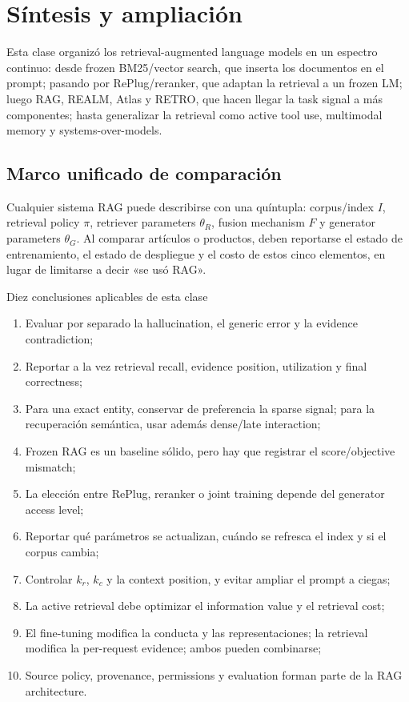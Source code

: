 \section{Síntesis y ampliación}

Esta clase organizó los retrieval-augmented language models en un espectro continuo: desde frozen BM25/vector search, que inserta los documentos en el prompt; pasando por RePlug/reranker, que adaptan la retrieval a un frozen LM; luego RAG, REALM, Atlas y RETRO, que hacen llegar la task signal a más componentes; hasta generalizar la retrieval como active tool use, multimodal memory y systems-over-models.

\subsection{Marco unificado de comparación}

Cualquier sistema RAG puede describirse con una quíntupla: corpus/index $I$, retrieval policy $\pi$, retriever parameters $\theta_R$, fusion mechanism $F$ y generator parameters $\theta_G$. Al comparar artículos o productos, deben reportarse el estado de entrenamiento, el estado de despliegue y el costo de estos cinco elementos, en lugar de limitarse a decir «se usó RAG».

\begin{importantbox}{Diez conclusiones aplicables de esta clase}
\begin{enumerate}
  \item Evaluar por separado la hallucination, el generic error y la evidence contradiction;
  \item Reportar a la vez retrieval recall, evidence position, utilization y final correctness;
  \item Para una exact entity, conservar de preferencia la sparse signal; para la recuperación semántica, usar además dense/late interaction;
  \item Frozen RAG es un baseline sólido, pero hay que registrar el score/objective mismatch;
  \item La elección entre RePlug, reranker o joint training depende del generator access level;
  \item Reportar qué parámetros se actualizan, cuándo se refresca el index y si el corpus cambia;
  \item Controlar $k_r$, $k_c$ y la context position, y evitar ampliar el prompt a ciegas;
  \item La active retrieval debe optimizar el information value y el retrieval cost;
  \item El fine-tuning modifica la conducta y las representaciones; la retrieval modifica la per-request evidence; ambos pueden combinarse;
  \item Source policy, provenance, permissions y evaluation forman parte de la RAG architecture.
\end{enumerate}
\end{importantbox}

